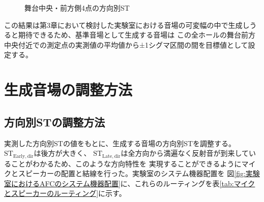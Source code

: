 \documentclass[11pt,a4j]{jreport}
\begin{document}
\begin{figure}[H]
\begin{minipage}
      \end{minipage}
    \centering
    \label{fig:舞台中央・前方側4点の方向別ST}
    \caption{舞台中央・前方側4点の方向別ST}
    \end{figure}

    この結果は第3章において検討した実験室における音場の可変幅の中で生成しうると期待できるため、基準音場として生成する音場は
    この全ホールの舞台前方中央付近での測定点の実測値の平均値から±1シグマ区間の間を目標値として設定する。
    


  \section{生成音場の調整方法}
    
    \subsection{方向別STの調整方法}
    実測した方向別STの値をもとに、生成する音場の方向別STを調整する。$\mathrm{ST_{Early,dir}}$は後方が大きく、
    $\mathrm{ST_{Late,dir}}$は全方向から満遍なく反射音が到来していることがわかるため、このような方向特性を
    実現することができるようにマイクとスピーカーの配置と結線を行った。実験室のシステム機器配置を
    図\ref{fig:実験室におけるAFCのシステム機器配置}に、これらのルーティングを表\ref{tab:マイクとスピーカーのルーティング}に示す。
\end{document}
